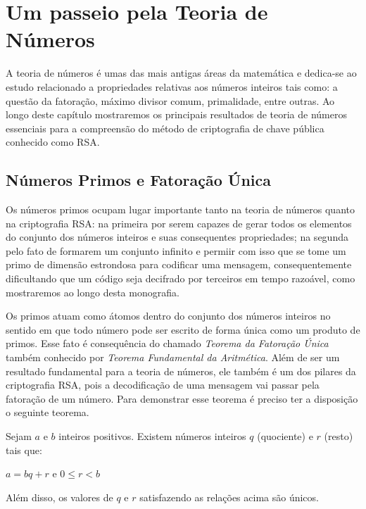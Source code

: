 \pagestyle{fancy}
\fancyhead[R]{\thepage}
\fancyfoot[C]{}


\chapter{Um passeio pela Teoria de N\'umeros}
\label{Num}

A teoria de n\'umeros \'e umas das mais antigas \'areas da matem\'atica e dedica-se ao estudo relacionado a propriedades relativas aos n\'umeros inteiros tais como: a quest\~ao da fatora\c{c}\~ao, m\'aximo divisor comum, primalidade, entre outras. Ao longo deste cap\'itulo mostraremos os principais resultados de teoria de n\'umeros essenciais para a compreens\~ao do m\'etodo de criptografia de chave p\'ublica conhecido como RSA.

\section{N\'umeros Primos e Fatora\c{c}\~ao \'Unica}

Os n\'umeros primos ocupam lugar importante tanto na teoria de n\'umeros quanto na criptografia RSA: na primeira por serem capazes de gerar todos os elementos do conjunto dos n\'umeros inteiros e suas consequentes propriedades; na segunda pelo fato de formarem um conjunto infinito e permiir com isso que se tome um primo de dimens\~ao estrondosa para codificar uma mensagem, consequentemente dificultando que um c\'odigo seja decifrado por terceiros em tempo razo\'avel, como mostraremos ao longo desta monografia.

Os primos atuam como \'atomos dentro do conjunto dos n\'umeros inteiros no sentido em que todo n\'umero pode ser escrito de forma 
\'{u}nica como um produto de primos. Esse fato \'e consequ\^encia do chamado \textit{Teorema da Fatora\c{c}\~ao \'Unica} tamb\'em conhecido por \textit{Teorema Fundamental da Aritm\'etica}. Al\'em de ser um resultado fundamental para a teoria de n\'umeros, ele tamb\'em \'e um dos pilares da criptografia RSA, pois a decodifica\c{c}\~ao de uma mensagem vai passar pela fatora\c{c}\~ao de um n\'umero. Para demonstrar esse teorema \'e preciso ter a disposi\c{c}\~ao o seguinte teorema. 


\begin{Th}
\label{teo.div}
Sejam $a$ e $b$ inteiros positivos. Existem n\'umeros inteiros $q$ (quociente) e $r$ (resto) tais que:	
	\begin{center}
		$a=bq+r$ e $0\leq r <b$
	\end{center}
Al\'em disso, os valores de $q$ e $r$ satisfazendo as rela\c{c}\~oes acima s\~ao \'unicos.
\end{Th} 

